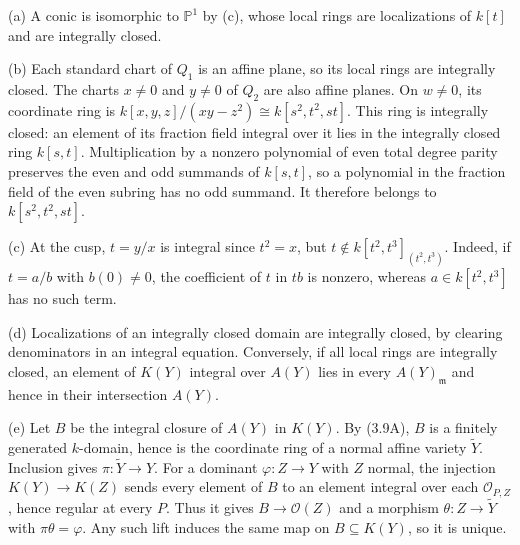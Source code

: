 (a) A conic is isomorphic to $\mathbb P^1$ by (c), whose local rings are localizations of $k[t]$ and are integrally closed.

(b) Each standard chart of $Q_1$ is an affine plane, so its local rings are integrally closed. The charts $x\ne0$ and $y\ne0$ of $Q_2$ are also affine planes. On $w\ne0$, its coordinate ring is $k[x,y,z]/(xy-z^2)\cong k[s^2,t^2,st]$. This ring is integrally closed: an element of its fraction field integral over it lies in the integrally closed ring $k[s,t]$. Multiplication by a nonzero polynomial of even total degree parity preserves the even and odd summands of $k[s,t]$, so a polynomial in the fraction field of the even subring has no odd summand. It therefore belongs to $k[s^2,t^2,st]$.

(c) At the cusp, $t=y/x$ is integral since $t^2=x$, but $t\notin k[t^2,t^3]_{(t^2,t^3)}$. Indeed, if $t=a/b$ with $b(0)\ne0$, the coefficient of $t$ in $tb$ is nonzero, whereas $a\in k[t^2,t^3]$ has no such term.

(d) Localizations of an integrally closed domain are integrally closed, by clearing denominators in an integral equation. Conversely, if all local rings are integrally closed, an element of $K(Y)$ integral over $A(Y)$ lies in every $A(Y)_{\mathfrak m}$ and hence in their intersection $A(Y)$.

(e) Let $B$ be the integral closure of $A(Y)$ in $K(Y)$. By (3.9A), $B$ is a finitely generated $k$-domain, hence is the coordinate ring of a normal affine variety $\widetilde Y$. Inclusion gives $\pi:\widetilde Y\to Y$. For a dominant $\varphi:Z\to Y$ with $Z$ normal, the injection $K(Y)\to K(Z)$ sends every element of $B$ to an element integral over each $\mathcal O_{P,Z}$, hence regular at every $P$. Thus it gives $B\to\mathcal O(Z)$ and a morphism $\theta:Z\to\widetilde Y$ with $\pi\theta=\varphi$. Any such lift induces the same map on $B\subseteq K(Y)$, so it is unique.
